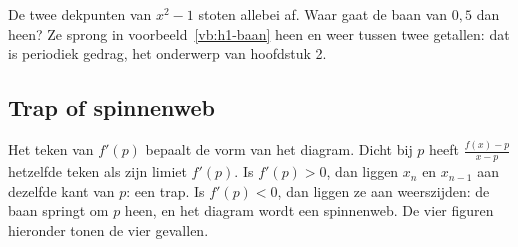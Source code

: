 \begin{oefeningen}
\end{oefeningen}

De twee dekpunten van $x^2 - 1$ stoten allebei af. Waar gaat de baan van $0{,}5$ dan heen? Ze sprong in voorbeeld~\ref{vb:h1-baan} heen en weer tussen twee getallen: dat is periodiek gedrag, het onderwerp van hoofdstuk 2.

\subsection{Trap of spinnenweb}

Het teken van $f'(p)$ bepaalt de vorm van het diagram. Dicht bij $p$ heeft $\tfrac{f(x) - p}{x - p}$ hetzelfde teken als zijn limiet $f'(p)$. Is $f'(p) > 0$, dan liggen $x_n$ en $x_{n-1}$ aan dezelfde kant van $p$: een trap. Is $f'(p) < 0$, dan liggen ze aan weerszijden: de baan springt om $p$ heen, en het diagram wordt een spinnenweb. De vier figuren hieronder tonen de vier gevallen.

